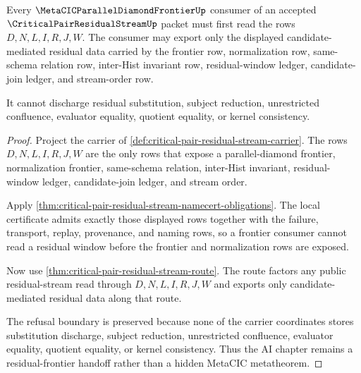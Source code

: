 \begin{theorem}
\label{thm:critical-pair-residual-stream-frontier-handoff}
Every $\MetaCICParallelDiamondFrontierUp$ consumer of an accepted $\CriticalPairResidualStreamUp$ packet must first read the rows $D,N,L,I,R,J,W$. The consumer may export only the displayed candidate-mediated residual data carried by the frontier row, normalization row, same-schema relation row, inter-Hist invariant row, residual-window ledger, candidate-join ledger, and stream-order row.

It cannot discharge residual substitution, subject reduction, unrestricted confluence, evaluator equality, quotient equality, or kernel consistency.
\end{theorem}
\begin{proof}
Project the carrier of \autoref{def:critical-pair-residual-stream-carrier}. The rows $D,N,L,I,R,J,W$ are the only rows that expose a parallel-diamond frontier, normalization frontier, same-schema relation, inter-Hist invariant, residual-window ledger, candidate-join ledger, and stream order.

Apply \autoref{thm:critical-pair-residual-stream-namecert-obligations}. The local certificate admits exactly those displayed rows together with the failure, transport, replay, provenance, and naming rows, so a frontier consumer cannot read a residual window before the frontier and normalization rows are exposed.

Now use \autoref{thm:critical-pair-residual-stream-route}. The route factors any public residual-stream read through $D,N,L,I,R,J,W$ and exports only candidate-mediated residual data along that route.

The refusal boundary is preserved because none of the carrier coordinates stores substitution discharge, subject reduction, unrestricted confluence, evaluator equality, quotient equality, or kernel consistency. Thus the AI chapter remains a residual-frontier handoff rather than a hidden MetaCIC metatheorem.
\end{proof}



